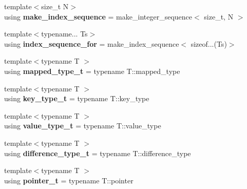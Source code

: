 \begin{DoxyCompactItemize}
\item 
\mbox{\label{namespacenlohmann_1_1detail_a9b47f1c18e3c9739b20633aeee0d0f62}} 
{\footnotesize template$<$size\+\_\+t N$>$ }\\using {\bfseries make\+\_\+index\+\_\+sequence} = make\+\_\+integer\+\_\+sequence$<$ size\+\_\+t, N $>$
\item 
\mbox{\label{namespacenlohmann_1_1detail_a24800493c6ec02ce033dcbb47b7fd28e}} 
{\footnotesize template$<$typename... Ts$>$ }\\using {\bfseries index\+\_\+sequence\+\_\+for} = make\+\_\+index\+\_\+sequence$<$ sizeof...(Ts)$>$
\item 
\mbox{\label{namespacenlohmann_1_1detail_a9c1795c148875722f8482d39e0eb9364}} 
{\footnotesize template$<$typename T $>$ }\\using {\bfseries mapped\+\_\+type\+\_\+t} = typename T\+::mapped\+\_\+type
\item 
\mbox{\label{namespacenlohmann_1_1detail_a66dfe39f03b05d6b7265a0ff748d64ef}} 
{\footnotesize template$<$typename T $>$ }\\using {\bfseries key\+\_\+type\+\_\+t} = typename T\+::key\+\_\+type
\item 
\mbox{\label{namespacenlohmann_1_1detail_af91beae90c2fb0f931079b3d50a343bc}} 
{\footnotesize template$<$typename T $>$ }\\using {\bfseries value\+\_\+type\+\_\+t} = typename T\+::value\+\_\+type
\item 
\mbox{\label{namespacenlohmann_1_1detail_a3603b59a17d1c5e15050743b847992f2}} 
{\footnotesize template$<$typename T $>$ }\\using {\bfseries difference\+\_\+type\+\_\+t} = typename T\+::difference\+\_\+type
\item 
\mbox{\label{namespacenlohmann_1_1detail_a26dc71e2dd9336587e56062178f9abce}} 
{\footnotesize template$<$typename T $>$ }\\using {\bfseries pointer\+\_\+t} = typename T\+::pointer
\item 

\end{DoxyCompactItemize}

